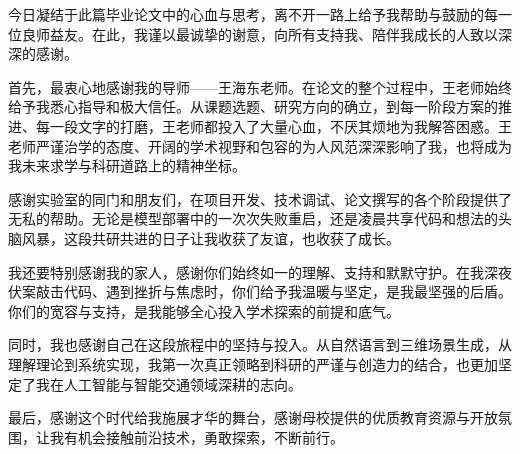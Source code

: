 \begin{acknowledgements} 
	
	今日凝结于此篇毕业论文中的心血与思考，离不开一路上给予我帮助与鼓励的每一位良师益友。在此，我谨以最诚挚的谢意，向所有支持我、陪伴我成长的人致以深深的感谢。
	
	首先，最衷心地感谢我的导师——王海东老师。在论文的整个过程中，王老师始终给予我悉心指导和极大信任。从课题选题、研究方向的确立，到每一阶段方案的推进、每一段文字的打磨，王老师都投入了大量心血，不厌其烦地为我解答困惑。王老师严谨治学的态度、开阔的学术视野和包容的为人风范深深影响了我，也将成为我未来求学与科研道路上的精神坐标。
	
	感谢实验室的同门和朋友们，在项目开发、技术调试、论文撰写的各个阶段提供了无私的帮助。无论是模型部署中的一次次失败重启，还是凌晨共享代码和想法的头脑风暴，这段共研共进的日子让我收获了友谊，也收获了成长。
	
	我还要特别感谢我的家人，感谢你们始终如一的理解、支持和默默守护。在我深夜伏案敲击代码、遇到挫折与焦虑时，你们给予我温暖与坚定，是我最坚强的后盾。你们的宽容与支持，是我能够全心投入学术探索的前提和底气。
	
	同时，我也感谢自己在这段旅程中的坚持与投入。从自然语言到三维场景生成，从理解理论到系统实现，我第一次真正领略到科研的严谨与创造力的结合，也更加坚定了我在人工智能与智能交通领域深耕的志向。
	
	最后，感谢这个时代给我施展才华的舞台，感谢母校提供的优质教育资源与开放氛围，让我有机会接触前沿技术，勇敢探索，不断前行。
	
\end{acknowledgements}